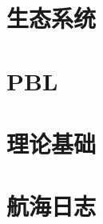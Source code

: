 \documentclass[UTF8,oneside]{ctexbook}
\begin{document}



\part{生态系统}





%
%
%

\part{PBL}




\part{理论基础}














% 











\part{航海日志}











% 
% 
\end{document}
